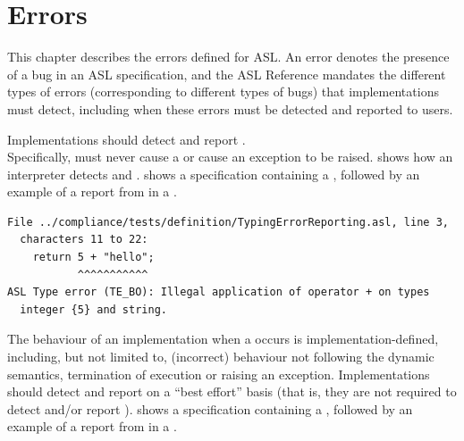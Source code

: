 \chapter{Errors\label{chap:Errors}}

This chapter describes the errors defined for ASL.
%
An error denotes the presence of a bug in an ASL specification,
and the ASL Reference mandates the different types of errors
(corresponding to different types of bugs) that implementations must detect,
including when these errors must be detected and reported to users.

\ChapterOutline

 Implementations should detect and report \staticerrorsterm. \\
Specifically, \staticerrorsterm{} must never cause a \dynamicerrorterm{} or
cause an exception to be raised.
%
 shows how an interpreter detects \builderrorsterm{}
and \typingerrorsterm{}.
%
 shows a specification containing a \typingerrorterm,
followed by an example of a report from \aslrefterm{} in a \linuxbashshellterm.

\begin{Verbatim}[fontsize=\footnotesize, frame=single]
File ../compliance/tests/definition/TypingErrorReporting.asl, line 3,
  characters 11 to 22:
    return 5 + "hello";
           ^^^^^^^^^^^
ASL Type error (TE_BO): Illegal application of operator + on types
  integer {5} and string.
\end{Verbatim}

 The behaviour of an implementation when a \dynamicerrorterm{}
occurs is implementation-defined, including, but not limited to,
(incorrect) behaviour not following the dynamic semantics, termination of execution or raising an exception.
%
Implementations should detect and report \dynamicerrorsterm{} on a ``best effort'' basis
(that is, they are not required to detect and/or report \dynamicerrorsterm{}).
%
 shows a specification containing a \dynamicerrorterm{},
followed by an example of a report from \aslrefterm{} in a \linuxbashshellterm.

